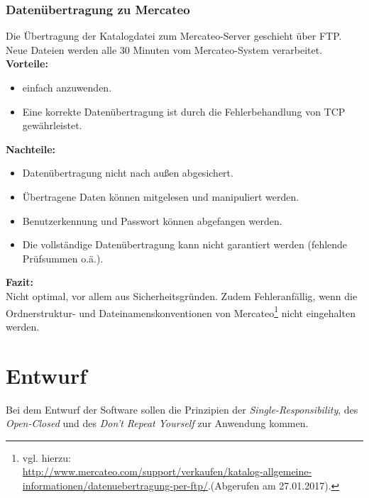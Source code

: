 	
	
	\subsubsection{Datenübertragung zu Mercateo}
	
	Die Übertragung der Katalogdatei zum Mercateo-Server geschieht über FTP. Neue Dateien werden alle 30 Minuten vom Mercateo-System verarbeitet.\\
	\textbf{Vorteile:}
 	\begin{itemize}[noitemsep]
   	\item einfach anzuwenden.
   	\item Eine korrekte Datenübertragung ist durch die Fehlerbehandlung von TCP gewährleistet.
   	\end{itemize}
	\textbf{Nachteile:}
   	\begin{itemize}[noitemsep]
   	\item Datenübertragung nicht nach außen abgesichert.
   	\item Übertragene Daten können mitgelesen und manipuliert werden.
   	\item Benutzerkennung und Passwort können abgefangen werden.
   	\item Die vollständige Datenübertragung kann nicht garantiert werden (fehlende Prüfsummen o.ä.).
   	\end{itemize}
   	\textbf{Fazit:}\\
	Nicht optimal, vor allem aus Sicherheitsgründen. Zudem Fehleranfällig, wenn die Ordnerstruktur- und Dateinamenskonventionen von Mercateo\footnote{vgl. hierzu:\\ \url{http://www.mercateo.com/support/verkaufen/katalog-allgemeine-informationen/datenuebertragung-per-ftp/}.(Abgerufen am 27.01.2017).} nicht eingehalten werden.

	\pagebreak	
	\section{Entwurf}
	
	Bei dem Entwurf der Software sollen die Prinzipien der \textit{Single-Responsibility}, des \textit{Open-Closed} und des \textit{Don't Repeat Yourself} zur Anwendung kommen.
	
